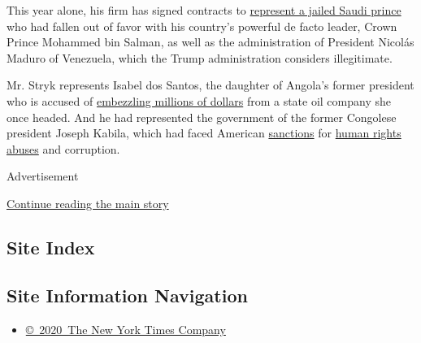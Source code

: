 This year alone, his firm has signed contracts to
\href{https://www.nytimes.com/2020/05/18/us/politics/jailed-saudis-crown-prince-mbs.html}{represent
a jailed Saudi prince} who had fallen out of favor with his country's
powerful de facto leader, Crown Prince Mohammed bin Salman, as well as
the administration of President Nicolás Maduro of Venezuela, which the
Trump administration considers illegitimate.

Mr. Stryk represents Isabel dos Santos, the daughter of Angola's former
president who is accused of
\href{https://www.nytimes.com/2020/01/23/world/africa/angola-santos-embezzlement.html}{embezzling
millions of dollars} from a state oil company she once headed. And he
had represented the government of the former Congolese president Joseph
Kabila, which had faced American
\href{https://www.nytimes.com/2017/06/02/world/africa/congo-officials-sanctioned.html}{sanctions}
for
\href{https://www.nytimes.com/2017/12/31/world/africa/congo-protest-joseph-kabila.html}{human
rights abuses} and corruption.

Advertisement

\protect\hyperlink{after-bottom}{Continue reading the main story}

\hypertarget{site-index}{%
\subsection{Site Index}\label{site-index}}

\hypertarget{site-information-navigation}{%
\subsection{Site Information
Navigation}\label{site-information-navigation}}

\begin{itemize}
\tightlist
\item
  \href{https://help.nytimes.com/hc/en-us/articles/115014792127-Copyright-notice}{©~2020~The
  New York Times Company}
\end{itemize}

